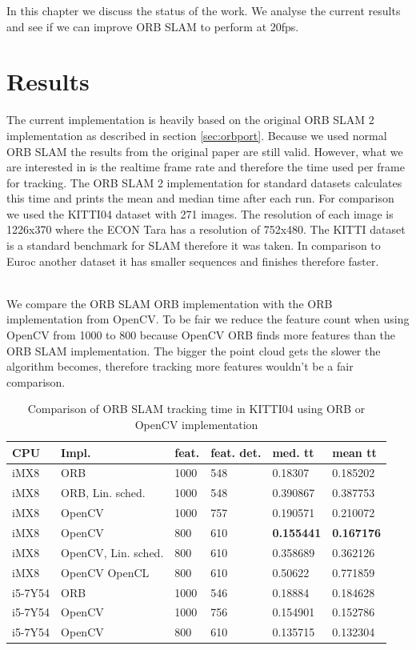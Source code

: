 \documentclass[11pt,a4paper,titlepage,oneside]{report}
\begin{document}
In this chapter we discuss the status of the work. We analyse the current results and see if we can improve ORB SLAM to perform at 20fps.

\section{Results}\label{sec:results}

The current implementation is heavily based on the original ORB SLAM 2 implementation as described in section \ref{sec:orbport}. Because we used normal ORB SLAM the results from the original paper are still valid. However, what we are interested in is the realtime frame rate and therefore the time used per frame for tracking. The ORB SLAM 2 implementation for standard datasets calculates this time and prints the mean and median time after each run. For comparison we used the KITTI04 dataset with 271 images. The resolution of each image is 1226x370 where the ECON Tara has a resolution of 752x480. The KITTI dataset is a standard benchmark for SLAM therefore it was taken. In comparison to Euroc another dataset it has smaller sequences and finishes therefore faster.\\\

We compare the ORB SLAM ORB implementation with the ORB implementation from OpenCV. To be fair we reduce the feature count when using OpenCV from 1000 to 800 because OpenCV ORB finds more features than the ORB SLAM implementation. The bigger the point cloud gets the slower the algorithm becomes, therefore tracking more features wouldn't be a fair comparison.\\

\begin{table}
	\begin{tabular}{  | l | l | l | l | l | l | }
		\hline
		\textbf{CPU} & \textbf{Impl.} & \textbf{feat.} & \textbf{feat. det.} & \textbf{med. tt} & \textbf{mean tt} \\ \hline
		iMX8 & ORB & 1000 &  548 & 0.18307 & 0.185202 \\ \hline
		iMX8 & ORB, Lin. sched. & 1000 & 548 & 0.390867 & 0.387753 \\ \hline
		iMX8 & OpenCV & 1000 & 757 & 0.190571 & 0.210072 \\ \hline
		iMX8 & OpenCV & 800 & 610 & \textbf{0.155441} & \textbf{0.167176} \\ \hline
		iMX8 & OpenCV, Lin. sched. & 800 & 610 & 0.358689 & 0.362126 \\ \hline
		iMX8 & OpenCV OpenCL & 800 & 610 & 0.50622 & 0.771859 \\ \hline
		i5-7Y54 & ORB & 1000 & 546 & 0.18884 & 0.184628 \\ \hline
		i5-7Y54 & OpenCV & 1000 & 756 & 0.154901 & 0.152786 \\ \hline
		i5-7Y54 & OpenCV & 800 & 610 & 0.135715 & 0.132304 \\ \hline
	\end{tabular}
	\caption{Comparison of ORB SLAM tracking time in KITTI04 using ORB or OpenCV implementation}
  \label{tab:result}
\end{table}
\end{document}
